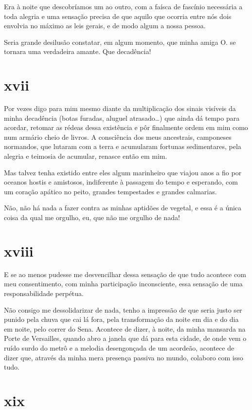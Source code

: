 Era à noite que descobríamos um ao outro, com a faísca de fascínio
necessária a toda alegria e uma sensação precisa de que aquilo que
ocorria entre nós dois envolvia no máximo as leis gerais, e de modo
algum a nossa pessoa.

Seria grande desilusão constatar, em algum momento, que minha amiga
O. se tornara uma verdadeira amante. Que decadência!

\section{xvii}

Por vezes digo para mim mesmo diante da multiplicação dos
sinais visíveis da minha decadência (botas furadas, aluguel
atrasado\ldots{}) que ainda dá tempo para acordar, retomar as rédeas
dessa existência e pôr finalmente ordem em mim como num armário cheio de
livros. A consciência dos meus ancestrais, camponeses normandos, que
lutaram com a terra e acumularam fortunas sedimentares, pela alegria e
teimosia de acumular, renasce então em mim.

Mas talvez tenha existido entre eles algum marinheiro que viajou anos a
fio por oceanos hostis e amistosos, indiferente à passagem do tempo e
esperando, com um coração apático no peito, grandes tempestades e
grandes calmarias.

Não, não há nada a fazer contra as minhas aptidões de vegetal, e essa é
a única coisa da qual me orgulho, eu, que não me orgulho de nada!

\section{xviii}

E se ao menos pudesse me desvencilhar dessa sensação de que
tudo acontece com meu consentimento, com minha participação
inconsciente, essa sensação de uma responsabilidade perpétua.

Não consigo me dessolidarizar de nada, tenho a impressão de que seria
justo ser punido pela chuva que cai lá fora, pela transformação da
noite em dia e do dia em noite, pelo correr do Sena. Acontece de
dizer, à noite, da minha mansarda na Porte de Versailles, quando abro a
janela que dá para esta cidade, de onde vem o ruído surdo do metrô e a
melodia desengonçada de um acordeão, acontece de dizer que, através
da minha mera presença passiva no mundo, colaboro com isso tudo.

\section{xix}

